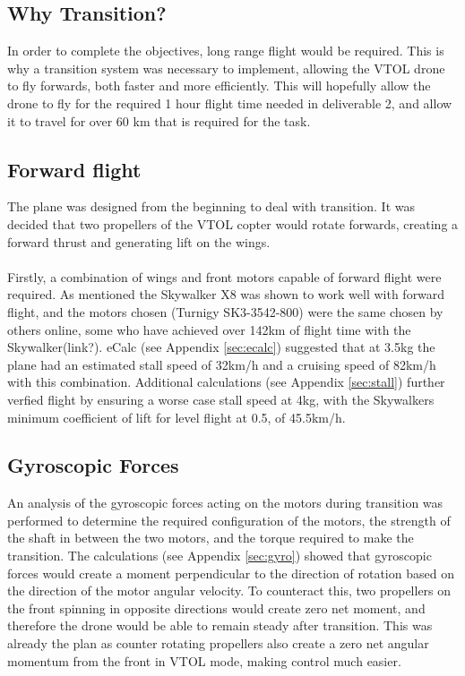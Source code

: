 

\subsection{Why Transition?}
In order to complete the objectives, long range flight would be required. This is why a transition system was necessary to implement, allowing the VTOL drone to fly forwards, both faster and more efficiently. This will hopefully allow the drone to fly for the required 1 hour flight time needed in deliverable 2, and allow it to travel for over 60 km that is required for the task. 

\subsection{Forward flight}
The plane was designed from the beginning to deal with transition. It was decided that two propellers of the VTOL copter would rotate forwards, creating a forward thrust and generating lift on the wings.  
\\\\
Firstly, a combination of wings and front motors capable of forward flight were required.  As mentioned the Skywalker X8 was shown to work well with forward flight, and the motors chosen (Turnigy SK3-3542-800) were the same chosen by others online, some who have achieved over 142km of flight time with the Skywalker(link?). eCalc (see Appendix \ref{sec:ecalc}) suggested that at 3.5kg the plane had an estimated stall speed of 32km/h and a cruising speed of 82km/h with this combination. Additional calculations (see Appendix \ref{sec:stall}) further verfied flight by ensuring a worse case stall speed at 4kg, with the Skywalkers minimum coefficient of lift for level flight at 0.5, of 45.5km/h. 

\subsection{Gyroscopic Forces}
An analysis of the gyroscopic forces acting on the motors during transition was performed to determine the required configuration of the motors, the strength of the shaft in between the two motors, and the torque required to make the transition. The calculations (see Appendix \ref{sec:gyro}) showed that gyroscopic forces would create a moment perpendicular to the direction of rotation based on the direction of the motor angular velocity. To counteract this, two propellers on the front spinning in opposite directions would create zero net moment, and therefore the drone would be able to remain steady after transition. This was already the plan as counter rotating propellers also create a zero net angular momentum from the front in VTOL mode, making control much easier.\\


